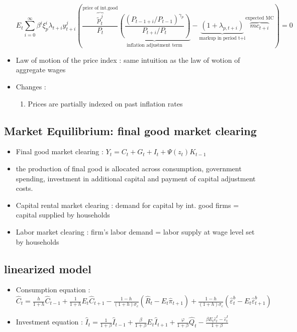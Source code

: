 \documentclass{article}
\begin{document}
\begin{itemize}
    \begin{equation}
    E_t \sum_{i=0}^\infty \beta^i \xi_p^i \lambda_{t+i} y_{t+i}^j  \left( \frac{\overbrace{\tilde{p}_t^j}^{\text{price of int.good}}}{P_t}   
\underbrace{\left( \frac{\left(P_{t-1+i}/P_{t-1}\right)^{\gamma_p}}{P_{t+i}/P_t} \right)}_{\text{inflation adjustment term}} - \underbrace{\left(1 + \lambda_{p,t+i}\right)}_{\text{markup in period t+i}} \overbrace{mc_{t+i}}^{\text{expected MC}} \right) = 0  
    \end{equation}
    \item Law of motion of the price index : same intuition as the law of wotion of aggregate wages 
    \item Changes : 
    \begin{enumerate}
        \item Prices are partially indexed on past inflation rates
    \end{enumerate}
\end{itemize}

\subsection{Market Equilibrium: final good market clearing}
\begin{itemize}
    \item Final good market clearing : $Y_t = C_t + G_t + I_t + \Psi(z_t)K_{t-1}$
    \item the production of final good is allocated across consumption, government spending, investment in additional capital and payment of capital adjustment costs. 
    \item Capital rental market clearing : demand for capital by int. good firms = capital supplied by households
    \item Labor market clearing : firm's labor demand = labor supply at wage level set by households
\end{itemize} 

\subsection{linearized model}
\begin{LLbox}
\begin{itemize}
    \item Consumption equation : $\hat{C}_t = {\frac{h}{1+h} \hat{C}_{t-1} + \frac{1}{1+h} E_t \hat{C}_{t+1}} - \frac{1-h}{(1+h)\sigma_c} \left( \hat{R}_t - E_t \hat{\pi}_{t+1} \right) + \frac{1-h}{(1+h)\sigma_c} \left( \hat{\varepsilon}_t^b - E_t \hat{\varepsilon}_{t+1}^b \right)$
    \item Investment equation : $\hat{I}_t = \frac{1}{1+\beta} \hat{I}_{t-1} + \frac{\beta}{1+\beta} E_t \hat{I}_{t+1} + \frac{\varphi}{1+\beta} \hat{Q}_t - \frac{\beta E_t \hat{\varepsilon}_t^I - \hat{\varepsilon}_t^I}{1+\beta}$
\end{itemize}
\end{LLbox}
\end{document}
